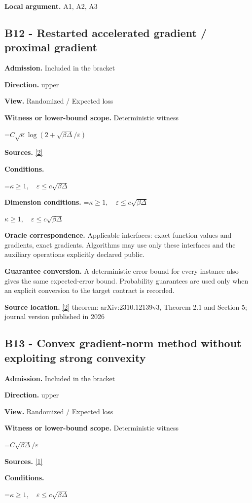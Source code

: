 \documentclass[10pt,a4paper]{article}
\newcommand{\AtlasMath}[1]{\par\begingroup\centering\setbox0=\hbox{$\displaystyle #1$}\ifdim\wd0>1.4\linewidth\typeout{ATLAS WIDE FORMULA: \the\wd0}\fi\ifdim\wd0>\linewidth\resizebox{\linewidth}{!}{\box0}\else\box0\fi\par\endgroup}
\newcommand{\AtlasInlineMath}[1]{\begingroup\setbox0=\hbox{$#1$}\ifdim\wd0>.4\linewidth\endgroup\AtlasMath{#1}\else\endgroup$#1$\fi}
\begin{document}
\textbf{Local argument.} A1, A2, A3

\subsection{B12 - Restarted accelerated gradient / proximal gradient}
\textbf{Admission.} Included in the bracket

\textbf{Direction.} upper

\textbf{View.} Randomized / Expected loss

\textbf{Witness or lower-bound scope.} Deterministic witness

\AtlasMath{C\sqrt\kappa\log(2+\sqrt{\beta\Delta}/\varepsilon)}
\textbf{Sources.} \href{https://doi.org/10.1007/s10107-026-02352-2}{[2]}

\textbf{Conditions.} 
\AtlasMath{\kappa\ge1,\quad\varepsilon\le c\sqrt{\beta\Delta}}


\textbf{Dimension conditions.} \AtlasInlineMath{\kappa\ge1,\quad\varepsilon\le c\sqrt{\beta\Delta}}

\textbf{Oracle correspondence.} Applicable interfaces: exact function values and gradients, exact gradients. Algorithms may use only these interfaces and the auxiliary operations explicitly declared public.

\textbf{Guarantee conversion.} A deterministic error bound for every instance also gives the same expected-error bound. Probability guarantees are used only when an explicit conversion to the target contract is recorded.

\textbf{Source location.} \href{https://doi.org/10.1007/s10107-026-02352-2}{[2]} theorem: arXiv:2310.12139v3, Theorem 2.1 and Section 5; journal version published in 2026

\subsection{B13 - Convex gradient-norm method without exploiting strong convexity}
\textbf{Admission.} Included in the bracket

\textbf{Direction.} upper

\textbf{View.} Randomized / Expected loss

\textbf{Witness or lower-bound scope.} Deterministic witness

\AtlasMath{C\sqrt{\beta\Delta}/\varepsilon}
\textbf{Sources.} \href{https://arxiv.org/pdf/1803.06600v4}{[1]}

\textbf{Conditions.} 
\AtlasMath{\kappa\ge1,\quad\varepsilon\le c\sqrt{\beta\Delta}}
\end{document}
